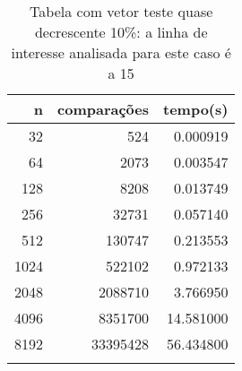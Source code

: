 \begin{table}[ht]
\centering
\begin{tabular}{rrr} \toprule
        n &    comparações &       tempo(s) \\ \midrule
      32  &            524 &      0.000919 \\
      64  &           2073 &      0.003547 \\
     128  &           8208 &      0.013749 \\
     256  &          32731 &      0.057140 \\
     512  &         130747 &      0.213553 \\
    1024  &         522102 &      0.972133 \\
    2048  &        2088710 &      3.766950 \\
    4096  &        8351700 &     14.581000 \\
    8192  &       33395428 &     56.434800 \\
\bottomrule\addlinespace
\end{tabular}
\caption{Tabela com vetor teste quase decrescente 10\%: a linha de interesse analisada para este caso é a 15}
\label{tab:insertionsortQuaseDecresc10}
\end{table}
